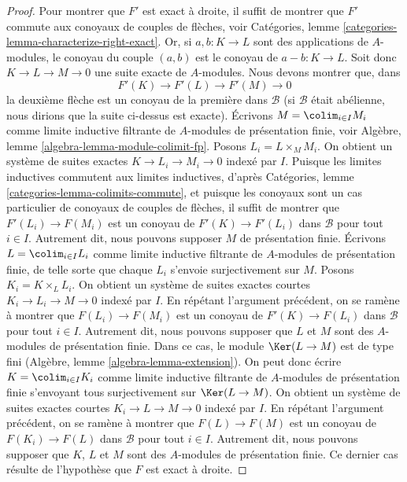 \begin{proof}
\medskip\noindent
Pour montrer que $F'$ est exact à droite, il suffit de montrer que $F'$ commute
aux conoyaux de couples de flèches, voir
Catégories, lemme \ref{categories-lemma-characterize-right-exact}.
Or, si $a, b : K \to L$ sont des applications de $A$-modules, le
conoyau du couple $(a,b)$ est le conoyau de $a - b : K \to L$.
Soit donc $K \to L \to M \to 0$ une suite exacte
de $A$-modules. Nous devons montrer que, dans
$$
F'(K) \to F'(L) \to F'(M) \to 0
$$
la deuxième flèche est un conoyau de la première dans $\mathcal{B}$
(si $\mathcal{B}$ était abélienne, nous dirions que la suite ci-dessus
est exacte).
Écrivons $M = \colim_{i \in I} M_i$ comme limite inductive filtrante de
$A$-modules de présentation finie, voir
Algèbre, lemme \ref{algebra-lemma-module-colimit-fp}.
Posons $L_i = L \times_M M_i$. 
On obtient un système de suites exactes $K \to L_i \to M_i \to 0$ indexé par $I$.
Puisque les limites inductives commutent aux limites inductives, d'après
Catégories, lemme \ref{categories-lemma-colimits-commute},
et puisque les conoyaux sont un cas particulier de conoyaux de couples de flèches,
il suffit de montrer que $F'(L_i) \to F(M_i)$ est un conoyau de
$F'(K) \to F'(L_i)$ dans $\mathcal{B}$ pour tout $i \in I$. Autrement dit, nous pouvons
supposer $M$ de présentation finie. Écrivons $L = \colim_{i \in I} L_i$
comme limite inductive filtrante de $A$-modules de présentation finie,
de telle sorte que chaque $L_i$ s'envoie surjectivement sur $M$.
Posons $K_i = K \times_L L_i$. On obtient un système de suites exactes courtes
$K_i \to L_i \to M \to 0$ indexé par $I$.
En répétant l'argument précédent, on se ramène à montrer que
$F(L_i) \to F(M_i)$ est un conoyau de
$F'(K) \to F(L_i)$ dans $\mathcal{B}$ pour tout $i \in I$.
Autrement dit, nous pouvons supposer que
$L$ et $M$ sont des $A$-modules de présentation finie.
Dans ce cas, le module $\Ker(L \to M)$ est de type fini
(Algèbre, lemme \ref{algebra-lemma-extension}).
On peut donc écrire $K = \colim_{i \in I} K_i$ comme limite inductive filtrante
de $A$-modules de présentation finie s'envoyant tous surjectivement sur $\Ker(L \to M)$.
On obtient un système de suites exactes courtes
$K_i \to L \to M \to 0$ indexé par $I$.
En répétant l'argument précédent, on se ramène à montrer que
$F(L) \to F(M)$ est un conoyau de
$F(K_i) \to F(L)$ dans $\mathcal{B}$ pour tout $i \in I$.
Autrement dit, nous pouvons supposer que $K$, $L$ et $M$
sont des $A$-modules de présentation finie. Ce dernier cas résulte
de l'hypothèse que $F$ est exact à droite.
\end{proof}

